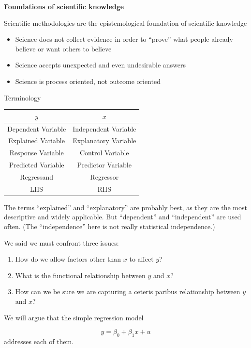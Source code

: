\documentclass[notes=show]{beamer}
\begin{document}
\begin{frame}[plain]
	\begin{center}
	\textbf{Foundations of scientific knowledge}
	\end{center}
 
Scientific methodologies are the epistemological foundation of scientific knowledge
			\begin{itemize}
		    	\item Science does not collect evidence in order to ``prove'' what people already believe or want others to believe
			\item Science accepts unexpected and even undesirable answers
			\item Science is process oriented, not outcome oriented
			\end{itemize}

\end{frame}


\begin{frame}[plain]
 \begin{center}
  Terminology \linebreak
  \begin{tabular}{|c|c|}
  \hline
  $y$ & $x$ \\ \hline
  Dependent Variable & Independent Variable \\ \hline
  Explained Variable & Explanatory Variable \\ \hline
  Response Variable & Control Variable \\ \hline
  Predicted Variable & Predictor Variable \\ \hline
  Regressand & Regressor \\ \hline
  LHS & RHS \\ \hline
  \end{tabular}
 \end{center}

 The terms ``explained'' and ``explanatory'' are probably best, as they are the most descriptive and widely applicable. But ``dependent'' and ``independent'' are used often. (The ``independence'' here is not really statistical independence.)
\end{frame}

\begin{frame}[plain]
 We said we must confront three issues:
 
 \begin{enumerate}
  \item How do we allow factors other than $x$ to affect $y$?

  \item What is the functional relationship between $y$ and $x$?

  \item How can we be sure we are capturing a ceteris paribus relationship between $y$ and $x$?
 \end{enumerate}
 
 We will argue that the simple regression model

 \begin{equation}
  y=\beta _{0}+\beta _{1}x+u
 \end{equation}
 addresses each of them.
\end{frame}
\end{document}
